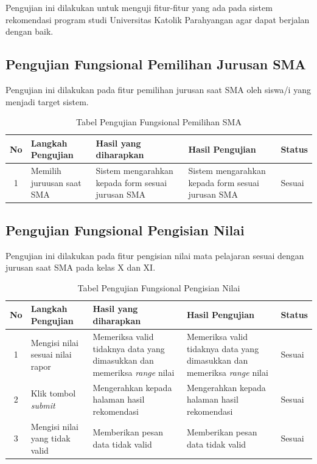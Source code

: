 Pengujian ini dilakukan untuk menguji fitur-fitur yang ada pada sistem rekomendasi program studi Universitas Katolik Parahyangan agar dapat berjalan dengan baik.

\subsection{Pengujian Fungsional Pemilihan Jurusan SMA}
\label{subsec:pengujian fungsional}

Pengujian ini dilakukan pada fitur pemilihan jurusan saat SMA oleh siswa/i yang menjadi target sistem.

\begin{table}[H]
    \centering
    \begin{tabular}{|c|p{3.5cm}|p{3.5cm}|p{3.5cm}|p{1.5cm}|}
        \hline
        No & Langkah Pengujian & Hasil yang diharapkan & Hasil Pengujian & Status \\
        \hline
        1 & Memilih juruusan saat SMA & Sistem mengarahkan kepada form sesuai jurusan SMA & Sistem mengarahkan kepada form sesuai jurusan SMA & Sesuai\\
        \hline
    \end{tabular}
    \caption{Tabel Pengujian Fungsional Pemilihan SMA}
    \label{tab:tabel pengujian fungsional pemilihan SMA}
\end{table}

\subsection{Pengujian Fungsional Pengisian Nilai}
\label{subsec:pengujian fungsional}

Pengujian ini dilakukan pada fitur pengisian nilai mata pelajaran sesuai dengan jurusan saat SMA pada kelas X dan XI. 

\begin{table}[H]
    \centering
    \begin{tabular}{|c|p{3.5cm}|p{3.5cm}|p{3.5cm}|p{1.5cm}|}
        \hline
        No & Langkah Pengujian & Hasil yang diharapkan & Hasil Pengujian & Status \\
        \hline
        1 & Mengisi nilai sesuai nilai rapor & Memeriksa valid tidaknya data yang dimasukkan dan memeriksa \textit{range} nilai & Memeriksa valid tidaknya data yang dimasukkan dan memeriksa \textit{range} nilai & Sesuai \\
        \hline
        2 & Klik tombol \textit{submit} & Mengerahkan kepada halaman hasil rekomendasi & Mengerahkan kepada halaman hasil rekomendasi & Sesuai \\
        \hline
        3 & Mengisi nilai yang tidak valid & Memberikan pesan data tidak valid & Memberikan pesan data tidak valid & Sesuai\\
        \hline
    \end{tabular}
    \caption{Tabel Pengujian Fungsional Pengisian Nilai}
    \label{tab:tabel pengujian fungsional pengisian nilai}
\end{table}


